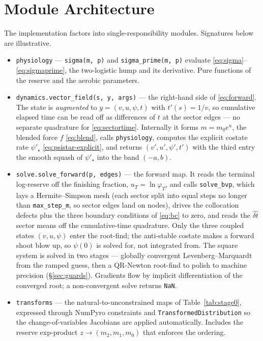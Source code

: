 \documentclass[11pt]{article}
\newcommand{\dt}{\widehat{\delta t}}
\begin{document}
\section{Module Architecture}

The implementation factors into single-responsibility modules. Signatures below are illustrative.

{\sloppy
\begin{itemize}
\item \texttt{physiology} --- \texttt{sigma(m, p)} and \texttt{sigma\_prime(m, p)} evaluate \eqref{eq:sigma}--\eqref{eq:sigmaprime}, the two-logistic hump and its derivative. Pure functions of the reserve and the aerobic parameters.

\item \texttt{dynamics.vector\_field(s, y, args)} --- the right-hand side of \eqref{eq:forward}. The state is \emph{augmented} to $y = (v, u, \psi, t)$ with $t'(s) = 1/v$, so cumulative elapsed time can be read off as differences of $t$ at the sector edges --- no separate quadrature for \eqref{eq:sectortime}. Internally it forms $m = m_0 e^u$, the blended force $f$ \eqref{eq:blend}, calls \texttt{physiology}, computes the explicit costate rate $\psi'_\star$ \eqref{eq:psistar-explicit}, and returns $(v', u', \psi', t')$ with the third entry the smooth squash of $\psi'_\star$ into the band $(-a, b)$.

\item \texttt{solve.solve\_forward(p, edges)} --- the forward map. It reads the terminal log-reserve off the finishing fraction, $u_T = \ln\varphi_T$, and calls \texttt{solve\_bvp}, which lays a Hermite--Simpson mesh (each sector split into equal steps no longer than \texttt{max\_step\_m}, so sector edges land on nodes), drives the collocation defects plus the three boundary conditions of \eqref{eq:bc} to zero, and reads the $\dt$ sector means off the cumulative-time quadrature. Only the three coupled states $(v, u, \psi)$ enter the root-find; the anti-stable costate makes a forward shoot blow up, so $\psi(0)$ is solved for, not integrated from. The square system is solved in two stages --- globally convergent Levenberg--Marquardt from the ramped guess, then a QR-Newton root-find to polish to machine precision (\S\ref{sec:guards}). Gradients flow by implicit differentiation of the converged root; a non-convergent solve returns \texttt{NaN}.

\item \texttt{transforms} --- the natural-to-unconstrained maps of Table~\ref{tab:stage0}, expressed through NumPyro constraints and \texttt{TransformedDistribution} so the change-of-variables Jacobians are applied automatically. Includes the reserve exp-product $z \to (m_2, m_1, m_0)$ that enforces the ordering.


\end{itemize}}
\end{document}
